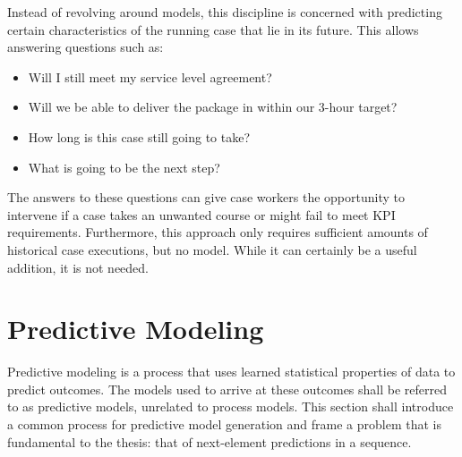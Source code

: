 Instead of revolving around models, this discipline is concerned with predicting certain characteristics of the running case that lie in its future. This allows answering questions such as:

\begin{itemize}
    \item Will I still meet my service level agreement?
    \item Will we be able to deliver the package in within our 3-hour target?
    \item How long is this case still going to take?
    \item What is going to be the next step?
\end{itemize}

The answers to these questions can give case workers the opportunity to intervene if a case takes an unwanted course or might fail to meet KPI requirements. Furthermore, this approach only requires sufficient amounts of historical case executions, but no model. While it can certainly be a useful addition, it is not needed. 


\section{Predictive Modeling}
Predictive modeling is a process that uses learned statistical properties of data to predict outcomes.
The models used to arrive at these outcomes shall be referred to as predictive models, unrelated to process models.
This section shall introduce a common process for predictive model generation and frame a problem that is fundamental to the thesis: that of next-element predictions in a sequence.

